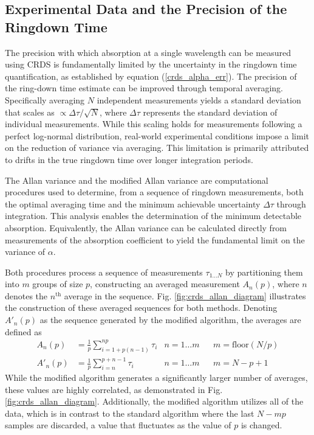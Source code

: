 \documentclass[12pt]{report}
\begin{document}
	\subsection{Experimental Data and the Precision of the Ringdown Time}
	The precision with which absorption at a single wavelength can be measured using CRDS is fundamentally limited by the uncertainty in the ringdown time quantification, as established by equation (\ref{crds_alpha_err}). The precision of the ring-down time estimate can be improved through temporal averaging. Specifically averaging $N$ independent measurements yields a standard deviation that scales as $\propto \Delta \tau / \sqrt{N}$, where $\Delta \tau$ represents the standard deviation of individual measurements. While this scaling holds for measurements following a perfect log-normal distribution, real-world experimental conditions impose a limit on the reduction of variance via averaging. This limitation is primarily attributed to drifts in the true ringdown time over longer integration periods.
	
	The Allan variance and the modified Allan variance \cite{allan_variance_mod} are computational procedures used to determine, from a sequence of ringdown measurements, both the optimal averaging time and the minimum achievable uncertainty $\Delta \tau$ through integration. This analysis enables the determination of the minimum detectable absorption. Equivalently, the Allan variance can be calculated directly from measurements of the absorption coefficient to yield the fundamental limit on the variance of $\alpha$.
	
	Both procedures process a sequence of measurements $\tau_{1\ldots N}$ by partitioning them into $m$ groups of size $p$, constructing an averaged measurement $A_n(p)$, where $n$ denotes the $n^\mathrm{th}$ average in the sequence. Fig. \ref{fig:crds_allan_diagram} illustrates the construction of these averaged sequences for both methods. Denoting $A'_n(p)$ as the sequence generated by the modified algorithm, the averages are defined as
	\begin{align}
		A_n(p) &= \frac{1}{p} \sum_{i=1 + p(n-1)}^{np}\tau_i& n=1\ldots m && m = \mathrm{floor}(N/p)  \\
		A'_n(p) &= \frac{1}{p} \sum_{i=n}^{p+n-1}\tau_i& n=1\ldots m && m = N - p + 1
	\end{align}
	While the modified algorithm generates a significantly larger number of averages, these values are highly correlated, as demonstrated in Fig. \ref{fig:crds_allan_diagram}. Additionally, the modified algorithm utilizes all of the data, which is in contrast to the standard algorithm where the last $N - mp$ samples are discarded, a value that fluctuates as the value of $p$ is changed.
	
\end{document}
